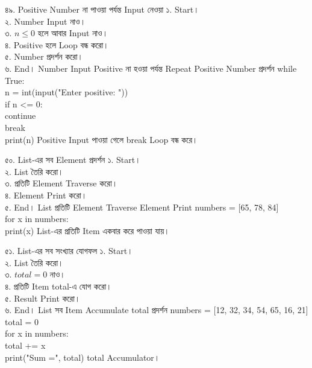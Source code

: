 
\exerciseTable
{৪৯. Positive Number না পাওয়া পর্যন্ত Input নেওয়া}
{
১. Start।\\
২. Number Input নাও।\\
৩. \(n\le0\) হলে আবার Input নাও।\\
৪. Positive হলে Loop বন্ধ করো।\\
৫. Number প্রদর্শন করো।\\
৬. End।
}
{
\linearflow
{Number Input}
{Positive না হওয়া পর্যন্ত Repeat}
{Positive Number প্রদর্শন}
}
{
while True:\\
\hspace*{4mm}n = int(input("Enter positive: "))\\
\hspace*{4mm}if n <= 0:\\
\hspace*{8mm}continue\\
\hspace*{4mm}break\\
print(n)
}
{
Positive Input পাওয়া গেলে
\textenglish{\ttfamily break}
Loop বন্ধ করে।
}




\exerciseTable
{৫০. List-এর সব Element প্রদর্শন}
{
১. Start।\\
২. List তৈরি করো।\\
৩. প্রতিটি Element Traverse করো।\\
৪. Element Print করো।\\
৫. End।
}
{
\linearflow
{List}
{প্রতিটি Element Traverse}
{Element Print}
}
{
numbers = [65, 78, 84]\\
for x in numbers:\\
\hspace*{4mm}print(x)
}
{
List-এর প্রতিটি Item একবার করে পাওয়া যায়।
}


\exerciseTable
{৫১. List-এর সব সংখ্যার যোগফল}
{
১. Start।\\
২. List তৈরি করো।\\
৩. \(total=0\) নাও।\\
৪. প্রতিটি Item total-এ যোগ করো।\\
৫. Result Print করো।\\
৬. End।
}
{
\linearflow
{List}
{সব Item Accumulate}
{total প্রদর্শন}
}
{
numbers = [12, 32, 34, 54, 65, 16, 21]\\
total = 0\\
for x in numbers:\\
\hspace*{4mm}total += x\\
print("Sum =", total)
}
{
\textenglish{\ttfamily total}
Accumulator।
}

